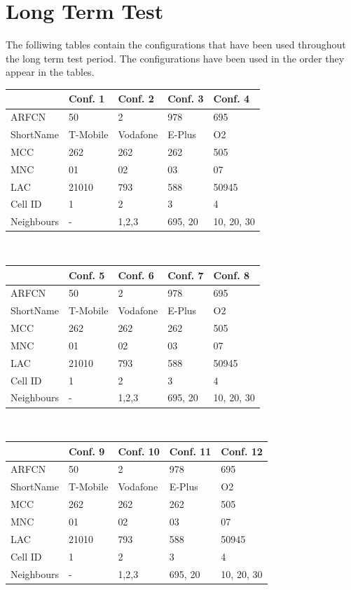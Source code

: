 \section{Long Term Test}
\label{sec:long_term_test}
The folliwing tables contain the configurations that have been used throughout the long term test period.
The configurations have been used in the order they appear in the tables.
\begin{center}
\begin{tabular}{lllll}
\toprule
			&Conf. 1		&Conf. 2		&Conf. 3		&Conf. 4\\
\midrule
ARFCN		&50				&2				&978			&695	\\
ShortName	&T-Mobile		&Vodafone		&E-Plus			&O2		\\
MCC			&262			&262			&262			&505	\\
MNC			&01				&02				&03				&07		\\
LAC			&21010			&793			&588			&50945	\\
Cell ID		&1				&2				&3				&4		\\
Neighbours	&-				&1,2,3			&695, 20		&10, 20, 30\\
\bottomrule
\end{tabular}\\
\vspace{1cm}
\begin{tabular}{lllll}
\toprule
			&Conf. 5		&Conf. 6		&Conf. 7		&Conf. 8\\
\midrule
ARFCN		&50				&2				&978			&695	\\
ShortName	&T-Mobile		&Vodafone		&E-Plus			&O2		\\
MCC			&262			&262			&262			&505	\\
MNC			&01				&02				&03				&07		\\
LAC			&21010			&793			&588			&50945	\\
Cell ID		&1				&2				&3				&4		\\
Neighbours	&-				&1,2,3			&695, 20		&10, 20, 30\\
\bottomrule
\end{tabular}\\
\vspace{1cm}
\begin{tabular}{lllll}
\toprule
			&Conf. 9		&Conf. 10		&Conf. 11		&Conf. 12\\
\midrule
ARFCN		&50				&2				&978			&695	\\
ShortName	&T-Mobile		&Vodafone		&E-Plus			&O2		\\
MCC			&262			&262			&262			&505	\\
MNC			&01				&02				&03				&07		\\
LAC			&21010			&793			&588			&50945	\\
Cell ID		&1				&2				&3				&4		\\
Neighbours	&-				&1,2,3			&695, 20		&10, 20, 30\\
\bottomrule
\end{tabular}
\end{center}